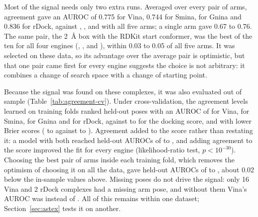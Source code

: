 Most of the signal needs only two extra runs. Averaged over every pair of arms, agreement
gave an AUROC of 0.775 for Vina, 0.744 for Smina,  for Gnina and 0.836 for rDock,
against , ,  and  with all five arms; a single arm gave 0.67 to 0.76.
The same pair, the \SI{2}{\angstrom} box with the RDKit start conformer, was the best of the
ten for all four engines (, ,  and ), within 0.03 to 0.05 of all five
arms. It was selected on these data, so its advantage over the average pair is optimistic,
but that one pair came first for every engine suggests the choice is not arbitrary: it
combines a change of search space with a change of starting point.

Because the signal was found on these complexes, it was also evaluated out of sample
(Table~\ref{tab:agreement-cv}). Under cross-validation, the agreement levels learned on
training folds ranked held-out poses with an AUROC of  for Vina,  for Smina, 
for Gnina and  for rDock, against  to  for the docking score, and with lower
Brier scores ( to  against  to ). Agreement added to the score rather
than restating it: a model with both reached held-out AUROCs of  to , and adding
agreement to the score improved the fit for every engine (likelihood-ratio test, $p <
10^{-30}$). Choosing the best pair of arms inside each training fold, which removes the
optimism of choosing it on all the data, gave held-out AUROCs of  to , about 0.02
below the in-sample values above. Missing poses do not drive the signal: only 16 Vina and 2
rDock complexes had a missing arm pose, and without them Vina's AUROC was  instead of
. All of this remains within one dataset; Section~\ref{sec:astex} tests it on another.

